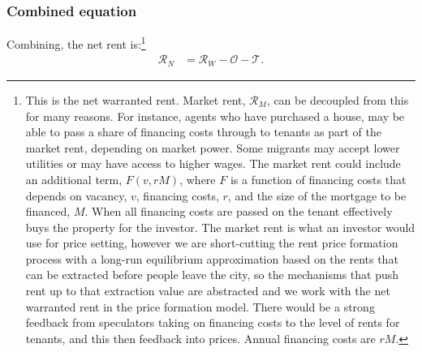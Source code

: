 \subsubsection{Combined equation}
Combining, the \gls{net rent} is:\footnote{This is the net warranted rent. Market rent, $\mathcal{R}_M$, can be decoupled from this for many reasons. For instance, agents who have purchased a house, may be able to pass a share of financing costs through to tenants as part of the market rent, depending on market power. Some  migrants may accept lower utilities or may have access to higher wages. The market rent could include an additional term, $F(v, rM)$, where $F$ is a function of financing costs that depends on %
vacancy, $v$, financing costs, $r$, and the size of the mortgage to be financed, $M$. When all financing costs are passed on the tenant effectively buys the property for the investor. The market rent is what an investor would use for price setting, however we are short-cutting the rent price formation process with a long-run equilibrium approximation based on the rents that can be extracted before people leave the city, so the mechanisms that push rent up to that extraction value are abstracted and we work with the net warranted rent in the price formation model. There would be a strong feedback from speculators taking on financing costs  to the level of rents for tenants, and this  then feedback into prices. %
% 
Annual financing costs are $rM$. 
}
\begin{align}
\mathcal{R}_N &= \mathcal{R}_W - \mathcal{O} - \mathcal{T}.
\end{align}

